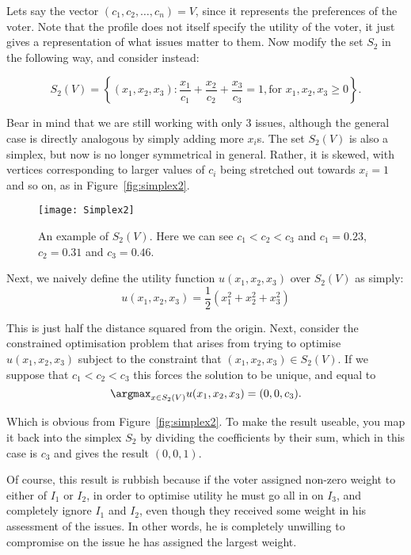 \documentclass[
10pt, %
a4paper, %
oneside, %
headinclude,footinclude, %
BCOR5mm, %
]{scrartcl}
\begin{document}
Lets say the vector $(c_1,c_2,\ldots,c_n) = V$, since it represents the preferences of the voter. Note that the profile does not itself specify the utility of the voter, it just gives a representation of what issues matter to them. Now modify the set $S_2$ in the following way, and consider instead:

$$S_2(V) = \left\{(x_1,x_2,x_3) \colon \frac{x_1}{c_1} + \frac{x_2}{c_2} + \frac{x_3}{c_3} = 1, \textrm{for } x_1,x_2,x_3 \geq 0\right\}.$$

Bear in mind that we are still working with only 3 issues, although the general case is directly analogous by simply adding more $x_i$s. The set $S_2(V)$ is also a simplex, but now is no longer symmetrical in general. Rather, it is skewed, with vertices corresponding to larger values of $c_i$ being stretched out towards $x_i = 1$ and so on, as in Figure~\vref{fig:simplex2}.

\begin{figure}[h]
\centering 
\texttt{[image: Simplex2]} 
\caption[Visualising $S_2(V)$]{An example of $S_2(V)$. Here we can see $c_1<c_2<c_3$ and $c_1 = 0.23$, $c_2 = 0.31$ and $c_3 = 0.46$.} %
\label{fig:simplex2} 
\end{figure}

Next, we naively define the utility function $u(x_1,x_2,x_3)$ over $S_2(V)$ as simply: $$u(x_1,x_2,x_3) = \frac{1}{2}(x_1^2 + x_2^2 + x_3^2)$$

This is just half the distance squared from the origin. Next, consider the constrained optimisation problem that arises from trying to optimise $u(x_1,x_2,x_3)$ subject to the constraint that $(x_1,x_2,x_3)\in S_2(V)$. If we suppose that $c_1< c_2 < c_3$ this forces the solution to be unique, and equal to $$\argmax_{x\in S_2(V)} u(x_1,x_2,x_3) = (0,0,c_3).$$

Which is obvious from Figure~\vref{fig:simplex2}. To make the result useable, you map it back into the simplex $S_2$ by dividing the coefficients by their sum, which in this case is $c_3$ and gives the result $(0,0,1)$.

Of course, this result is rubbish because if the voter assigned non-zero weight to either of $I_1$ or $I_2$, in order to optimise utility he must go all in on $I_3$, and completely ignore $I_1$ and $I_2$, even though they received some weight in his assessment of the issues. In other words, he is completely unwilling to compromise on the issue he has assigned the largest weight.
\end{document}
